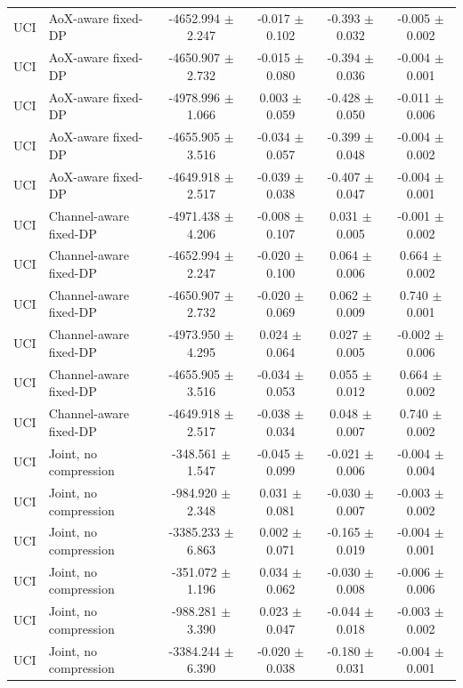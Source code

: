 \begin{table}[t]
\begin{tabular}{llcccc}
UCI & AoX-aware fixed-DP & -4652.994 $\pm$ 2.247 & -0.017 $\pm$ 0.102 & -0.393 $\pm$ 0.032 & -0.005 $\pm$ 0.002 \\
UCI & AoX-aware fixed-DP & -4650.907 $\pm$ 2.732 & -0.015 $\pm$ 0.080 & -0.394 $\pm$ 0.036 & -0.004 $\pm$ 0.001 \\
UCI & AoX-aware fixed-DP & -4978.996 $\pm$ 1.066 & 0.003 $\pm$ 0.059 & -0.428 $\pm$ 0.050 & -0.011 $\pm$ 0.006 \\
UCI & AoX-aware fixed-DP & -4655.905 $\pm$ 3.516 & -0.034 $\pm$ 0.057 & -0.399 $\pm$ 0.048 & -0.004 $\pm$ 0.002 \\
UCI & AoX-aware fixed-DP & -4649.918 $\pm$ 2.517 & -0.039 $\pm$ 0.038 & -0.407 $\pm$ 0.047 & -0.004 $\pm$ 0.001 \\
UCI & Channel-aware fixed-DP & -4971.438 $\pm$ 4.206 & -0.008 $\pm$ 0.107 & 0.031 $\pm$ 0.005 & -0.001 $\pm$ 0.002 \\
UCI & Channel-aware fixed-DP & -4652.994 $\pm$ 2.247 & -0.020 $\pm$ 0.100 & 0.064 $\pm$ 0.006 & 0.664 $\pm$ 0.002 \\
UCI & Channel-aware fixed-DP & -4650.907 $\pm$ 2.732 & -0.020 $\pm$ 0.069 & 0.062 $\pm$ 0.009 & 0.740 $\pm$ 0.001 \\
UCI & Channel-aware fixed-DP & -4973.950 $\pm$ 4.295 & 0.024 $\pm$ 0.064 & 0.027 $\pm$ 0.005 & -0.002 $\pm$ 0.006 \\
UCI & Channel-aware fixed-DP & -4655.905 $\pm$ 3.516 & -0.034 $\pm$ 0.053 & 0.055 $\pm$ 0.012 & 0.664 $\pm$ 0.002 \\
UCI & Channel-aware fixed-DP & -4649.918 $\pm$ 2.517 & -0.038 $\pm$ 0.034 & 0.048 $\pm$ 0.007 & 0.740 $\pm$ 0.002 \\
UCI & Joint, no compression & -348.561 $\pm$ 1.547 & -0.045 $\pm$ 0.099 & -0.021 $\pm$ 0.006 & -0.004 $\pm$ 0.004 \\
UCI & Joint, no compression & -984.920 $\pm$ 2.348 & 0.031 $\pm$ 0.081 & -0.030 $\pm$ 0.007 & -0.003 $\pm$ 0.002 \\
UCI & Joint, no compression & -3385.233 $\pm$ 6.863 & 0.002 $\pm$ 0.071 & -0.165 $\pm$ 0.019 & -0.004 $\pm$ 0.001 \\
UCI & Joint, no compression & -351.072 $\pm$ 1.196 & 0.034 $\pm$ 0.062 & -0.030 $\pm$ 0.008 & -0.006 $\pm$ 0.006 \\
UCI & Joint, no compression & -988.281 $\pm$ 3.390 & 0.023 $\pm$ 0.047 & -0.044 $\pm$ 0.018 & -0.003 $\pm$ 0.002 \\
UCI & Joint, no compression & -3384.244 $\pm$ 6.390 & -0.020 $\pm$ 0.038 & -0.180 $\pm$ 0.031 & -0.004 $\pm$ 0.001 \\

\end{tabular}
\end{table}

